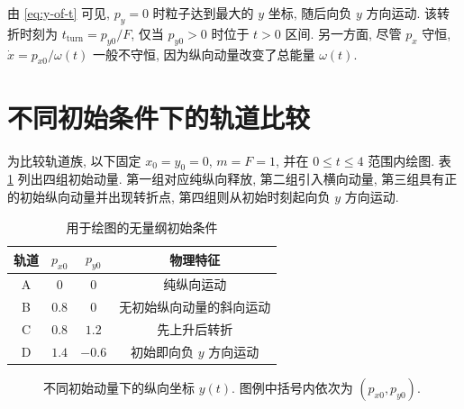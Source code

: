 \documentclass[UTF8, a4paper, 11pt]{ctexart}
\newcommand{\F}{F}
\begin{document}
由 \eqref{eq:y-of-t} 可见, $p_y=0$ 时粒子达到最大的 $y$ 坐标, 随后向负 $y$ 方向运动. 该转折时刻为 $t_\mathrm{turn}=p_{y0}/\F$, 仅当 $p_{y0}>0$ 时位于 $t>0$ 区间. 另一方面, 尽管 $p_x$ 守恒, $\dot x=p_{x0}/\omega(t)$ 一般不守恒, 因为纵向动量改变了总能量 $\omega(t)$.

\section{不同初始条件下的轨道比较}

为比较轨道族, 以下固定 $x_0=y_0=0$, $m=\F=1$, 并在 $0\le t\le 4$ 范围内绘图. 表 \ref{tab:initial-conditions} 列出四组初始动量. 第一组对应纯纵向释放, 第二组引入横向动量, 第三组具有正的初始纵向动量并出现转折点, 第四组则从初始时刻起向负 $y$ 方向运动.

\begin{table}[htbp]
  \centering
  \caption{用于绘图的无量纲初始条件}
  \label{tab:initial-conditions}
  \begin{tabular}{cccc}
    \toprule
    轨道 & $p_{x0}$ & $p_{y0}$ & 物理特征 \\
    \midrule
    A & $0$   & $0$    & 纯纵向运动 \\
    B & $0.8$ & $0$    & 无初始纵向动量的斜向运动 \\
    C & $0.8$ & $1.2$  & 先上升后转折 \\
    D & $1.4$ & $-0.6$ & 初始即向负 $y$ 方向运动 \\
    \bottomrule
  \end{tabular}
\end{table}

\begin{figure}[htbp]
  \centering
  \caption{不同初始动量下的纵向坐标 $y(t)$. 图例中括号内依次为 $(p_{x0},p_{y0})$.}
  \label{fig:y-t}
\end{figure}
\end{document}

